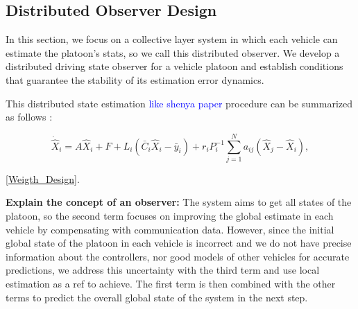 \documentclass[letterpaper, 10pt, conference]{ieeeconf}  %
\begin{document}
\subsection{Distributed Observer Design}
In this section, we focus on a collective layer system in which each vehicle can estimate the platoon's stats, so we call this distributed observer. We develop a distributed driving state observer for a vehicle platoon and establish conditions that guarantee
the stability of its estimation error dynamics.



This distributed state estimation \textcolor{blue}{like shenya paper} procedure can be summarized as follows :

\begin{equation}
\dot{\hat{X}}_i=A \hat{X}_i+F+L_i\left(\bar{C}_i \hat{X}_i-\bar{y}_i\right)+r_i P_i^{-1} \sum_{j=1}^N a_{i j}\left(\hat{X}_j-\hat{X}_i\right),
\end{equation}

\ref{Weigth_Design}. 


\textbf{Explain the concept of an observer:} The system aims to get all states of the platoon, so the second term focuses on improving the global estimate in each vehicle by compensating with communication data. However, since the initial global state of the platoon in each vehicle is incorrect and we do not have precise information about the controllers, nor good models of other vehicles for accurate predictions, we address this uncertainty with the third term and use local estimation as a ref to achieve. The first term is then combined with the other terms to predict the overall global state of the system in the next step.

\end{document}
